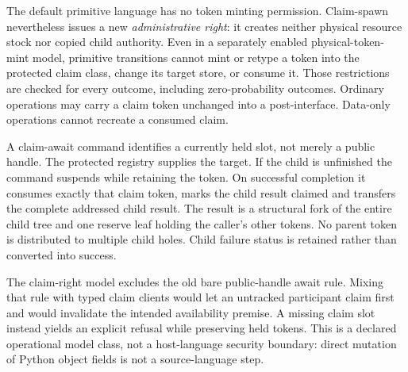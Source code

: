 \documentclass[11pt]{article}
\begin{document}
The default primitive language has no token minting permission. Claim-spawn nevertheless issues a new \emph{administrative right}: it creates neither physical resource stock nor copied child authority. Even in a separately enabled physical-token-mint model, primitive transitions cannot mint or retype a token into the protected claim class, change its target store, or consume it. Those restrictions are checked for every outcome, including zero-probability outcomes. Ordinary operations may carry a claim token unchanged into a post-interface. Data-only operations cannot recreate a consumed claim.

A claim-await command identifies a currently held slot, not merely a public handle. The protected registry supplies the target. If the child is unfinished the command suspends while retaining the token. On successful completion it consumes exactly that claim token, marks the child result claimed and transfers the complete addressed child result. The result is a structural fork of the entire child tree and one reserve leaf holding the caller's other tokens. No parent token is distributed to multiple child holes. Child failure status is retained rather than converted into success.

The claim-right model excludes the old bare public-handle await rule. Mixing that rule with typed claim clients would let an untracked participant claim first and would invalidate the intended availability premise. A missing claim slot instead yields an explicit refusal while preserving held tokens. This is a declared operational model class, not a host-language security boundary: direct mutation of Python object fields is not a source-language step.
\end{document}
